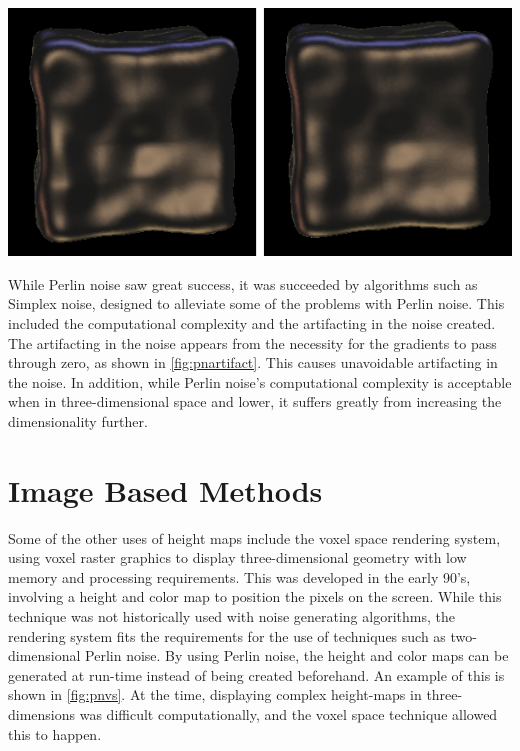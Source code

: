 \documentclass[10pt]{report}
\begin{document}
		\begin{minipage}{\textwidth}
			\centering
			\includegraphics[scale=.5]{s-curve}
			\label{fig:pnartifact}
		\end{minipage} 
		
		While Perlin noise saw great success, it was succeeded by algorithms such as Simplex noise, designed to alleviate some of the problems with Perlin noise. This included the computational complexity and the artifacting in the noise created. The artifacting in the noise appears from the necessity for the gradients to pass through zero, as shown in \autoref{fig:pnartifact}. This causes unavoidable artifacting in the noise. In addition, while Perlin noise's computational complexity is acceptable when in three-dimensional space and lower, it suffers greatly from increasing the dimensionality further.
	
	\vspace{10pt}
	\let\clearpage\relax
	\chapter{Image Based Methods}
	
		Some of the other uses of height maps include the voxel space rendering system, using voxel raster graphics to display three-dimensional geometry with low memory and processing requirements. This was developed in the early 90's, involving a height and color map to position the pixels on the screen. While this technique was not historically used with noise generating algorithms, the rendering system fits the requirements for the use of techniques such as two-dimensional Perlin noise. By using Perlin noise, the height and color maps can be generated at run-time instead of being created beforehand. An example of this is shown in \autoref{fig:pnvs}. At the time, displaying complex height-maps in three-dimensions was difficult computationally, and the voxel space technique allowed this to happen. 
		
\end{document}

